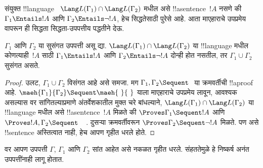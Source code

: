 \documentclass[../../../include/open-logic-section]{subfiles}
\begin{document}
संयुक्त !!{language}~
$\Lang L(\Gamma_1) \cap \Lang L(\Gamma_2)$
मधील असे !!a{sentence}~$!A$
नसणे की $\Gamma_1
\Entails !A$ आणि
$\Gamma_2 \Entails \lnot !A$,
हेच सिद्धतेसाठी पुरेसे आहे.
आता माएहाराचे उपप्रमेय वापरून
ही सिद्धता सिद्धता-उपपत्तीय
पद्धतीने देऊ.

\begin{thm}
$\Gamma_1$ आणि $\Gamma_2$
या सुसंगत उपपत्ती असू द्या.
$\Lang L(\Gamma_1) \cap \Lang L(\Gamma_2)$
या !!{language} मधील कोणत्याही~$!A$
साठी $\Gamma_1 \Entails !A$
आणि $\Gamma_2 \Entails \lnot !A$
दोन्ही होत नसतील, तर
$\Gamma_1 \cup \Gamma_2$ सुसंगत असते.
\end{thm}

\begin{proof}
  उलट, $\Gamma_1 \cup \Gamma_2$
  विसंगत आहे असे समजा.
  मग $\Gamma_1, \Gamma_2 \Sequent \ $
  या क्रमवर्तीची !!a{proof} आहे.
  $\maeh{\Gamma_1}{\Gamma_2}
  \Sequent \maeh{\ }{\ }$ याला
  माएहाराचे उपप्रमेय लावून, आवश्यक असल्यास वर
  सांगितल्याप्रमाणे अंतर्वेशकातील मुक्त चरे बांधल्याने,
  $\Lang L(\Gamma_1) \cap \Lang L(\Gamma_2)$
  या !!{language} मधील असे
  !!a{sentence}~$!A$ मिळते की
  $\Proves \Gamma_1 \Sequent !A$
  आणि $\Proves !A, \Gamma_2 \Sequent
  \quad$. दुसऱ्या क्रमवर्तीवरून
  $\Proves \Gamma_2 \Sequent \lnot !A$
  मिळते. पण असे !!{sentence}
  अस्तित्वात नाही, हेच आपण
  गृहीत धरले होते.
\end{proof}

वर आपण उपपत्ती $\Gamma$,
$\Gamma_1$ आणि $\Gamma_2$
सांत आहेत असे नकळत गृहीत धरले.
संहततेमुळे हे निष्कर्ष
अनंत उपपत्तींनाही लागू होतात.
\end{document}
